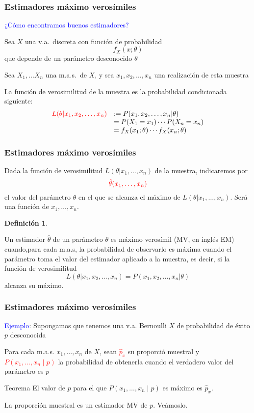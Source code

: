 \documentclass[12pt,t]{beamer}\usepackage[]{graphicx}\usepackage[]{color}
\newcommand{\red}[1]{\textcolor{red}{#1}}
\newcommand{\blue}[1]{\textcolor{blue}{#1}}
\renewcommand{\emph}[1]{{\color{red}#1}}
\theoremstyle{plain}
\theoremstyle{definition}
\newtheorem{defin}{Definición}
\begin{document}
\begin{frame}
\frametitle{Estimadores máximo verosímiles}

\blue{¿Cómo encontramos buenos estimadores?}
\medskip

Sea $X$ una v.a.\ \emph{discreta} con función de probabilidad
$$
f_X(x;\theta)
$$
que depende de un
parámetro  desconocido $\theta$
\medskip

Sea $X_{1},\ldots X_{n}$ una m.a.s.\ de $X$, y sea $x_1,x_2,\ldots,x_n$ una realización de esta muestra
\medskip


La \emph{función de verosimilitud} de la muestra es la probabilidad condicionada siguiente:
$$
\begin{array}{rl}
\red{L(\theta|x_1,x_2,\ldots,x_n)} & := P(x_1,x_2,\ldots,x_n|\theta)\\&=P(X_1=x_1)\cdots P(X_n=x_n)\\
& = f_X(x_1;\theta)\cdots f_X(x_n;\theta)
\end{array}
$$

\end{frame}

\begin{frame}
\frametitle{Estimadores máximo verosímiles}

Dada la función de verosimilitud $L(\theta|x_1,\ldots,x_n)$ de la muestra, indicaremos por 
$$
\red{\hat{\theta}(x_1,\ldots,x_n)}
$$ 
el valor del parámetro  $\theta$ en el que  se alcanza  el máximo
de $L(\theta|x_1,\ldots,x_n)$. Será una función de $x_1,\ldots,x_n$.
\medskip


\begin{defin}
\begin{small}
Un estimador $\hat{\theta}$ de un parámetro  $\theta$ es \emph{máximo verosímil} (\emph{MV}, en inglés \emph{EM}) cuando,para  cada m.a.s, la probabilidad de observarlo  es máxima cuando el parámetro  toma el valor del estimador aplicado a la muestra,  es decir, si la función de verosimilitud
$$L(\theta|x_1,x_2,\ldots,x_n)= P(x_1,x_2,\ldots,x_n|\theta)$$
 alcanza su máximo.
 \end{small}
\end{defin}
\end{frame}

\begin{frame}
\frametitle{Estimadores máximo verosímiles}

\blue{Ejemplo}: Supongamos que tenemos una v.a. Bernoulli $X$ de probabilidad de éxito $p$ desconocida\medskip

Para cada m.a.s. $x_1,\ldots,x_n$ de $X$, sean \red{$\widehat{p}_x$}  su  proporció muestral y  \red{$P(x_1,\ldots,x_n\mid p)$} la probabilidad de obtenerla cuando  el verdadero valor del  parámetro  es $p$

\begin{block}{Teorema}
El valor de $p$ para el que $P(x_1,\ldots,x_n\mid p)$ es máximo es $\widehat{p}_x$.
\end{block}

La proporción muestral es un estimador MV de $p$. Veámoslo. 

\end{frame}
\end{document}
